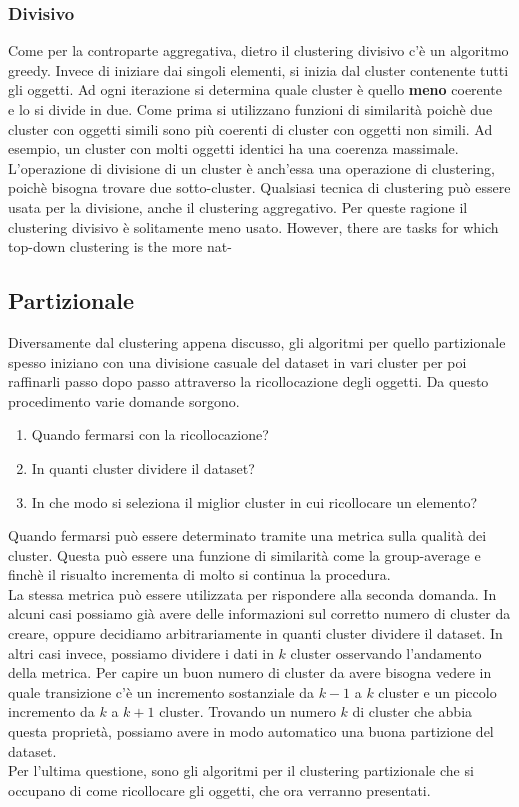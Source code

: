 \documentclass{llncs}
\newcommand{\acapo}{\vspace{0.5\baselineskip}\\}
\begin{document}
	\subsubsection{Divisivo}
	Come per la controparte aggregativa, dietro il clustering divisivo c'è un algoritmo greedy. Invece di iniziare dai singoli elementi, si inizia dal cluster contenente tutti gli oggetti. Ad ogni iterazione
	si determina quale cluster è quello \textbf{meno} coerente e lo si divide in due. Come prima si utilizzano funzioni di similarità poichè due cluster con oggetti simili sono più coerenti
	di cluster con oggetti non simili. Ad esempio, un cluster con molti oggetti identici ha una coerenza massimale. L'operazione di divisione di un cluster è anch'essa una operazione di clustering, poichè bisogna trovare
	due sotto-cluster. Qualsiasi tecnica di clustering può essere usata per la divisione, anche il clustering aggregativo. Per queste ragione il clustering divisivo è solitamente meno usato.
	However, there are tasks for which top-down clustering is the more nat-
	
	\subsection{Partizionale}
	Diversamente dal clustering appena discusso, gli algoritmi per quello partizionale spesso
	iniziano con una divisione casuale del dataset in vari cluster per poi raffinarli passo dopo passo attraverso 
	la ricollocazione degli oggetti. Da questo procedimento varie domande sorgono. 
	\begin{enumerate}
		\item Quando fermarsi con la ricollocazione?
		\item In quanti cluster dividere il dataset?
		\item In che modo si seleziona il miglior cluster in cui ricollocare un elemento?
	\end{enumerate} 
	Quando fermarsi può essere determinato tramite una metrica sulla qualità dei cluster. Questa può essere una funzione 
	di similarità come la group-average e finchè il risualto incrementa di molto si continua la procedura.
	\acapo
	La stessa metrica può essere utilizzata per rispondere alla seconda domanda. In alcuni casi possiamo già avere
	delle informazioni sul corretto numero di cluster da creare, oppure decidiamo arbitrariamente in quanti cluster dividere il dataset.
	In altri casi invece, possiamo dividere i dati in $k$ cluster osservando l'andamento della metrica.
	Per capire un buon numero di cluster da avere bisogna vedere in quale transizione c'è un 
	incremento sostanziale da $k-1$ a $k$ cluster e un piccolo incremento da $k$ a $k+1$ cluster.
	Trovando un numero $k$ di cluster che abbia questa proprietà, possiamo avere in modo automatico una buona partizione del dataset.
	\acapo
	Per l'ultima questione, sono gli algoritmi per il clustering partizionale che si occupano di come ricollocare gli oggetti, che ora verranno 
	presentati.
\end{document}

